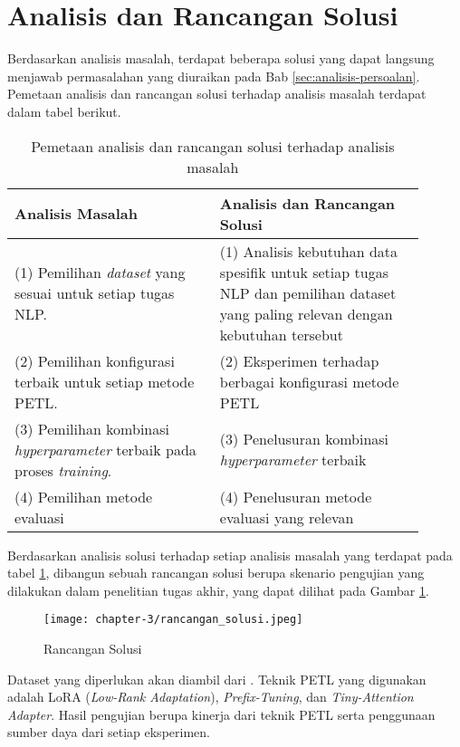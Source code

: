 \section{Analisis dan Rancangan Solusi}

Berdasarkan analisis masalah, terdapat beberapa solusi yang dapat langsung menjawab permasalahan yang diuraikan pada Bab \ref{sec:analisis-persoalan}. Pemetaan analisis dan rancangan solusi terhadap analisis masalah terdapat dalam tabel berikut.

\begin{table}[h!]
    \centering
    \begin{tabular}{|m{0.45\linewidth}|m{0.45\linewidth}|}
    \hline
    \textbf{Analisis Masalah} & \textbf{Analisis dan Rancangan Solusi} \\ \hline
    (1) Pemilihan \textit{dataset} yang sesuai untuk setiap tugas NLP.& (1) Analisis kebutuhan data spesifik untuk setiap tugas NLP dan pemilihan dataset yang paling relevan dengan kebutuhan tersebut\\ \hline
    (2) Pemilihan konfigurasi terbaik untuk setiap metode PETL. & (2) Eksperimen terhadap berbagai konfigurasi metode PETL \\ \hline
    (3) Pemilihan kombinasi \textit{hyperparameter} terbaik pada proses \textit{training}. & (3) Penelusuran kombinasi \textit{hyperparameter} terbaik\\ \hline
    (4) Pemilihan metode evaluasi & (4) Penelusuran metode evaluasi yang relevan \\ \hline
    \end{tabular}
\caption{Pemetaan analisis dan rancangan solusi terhadap analisis masalah}
\label{table:pemetaan-masalah-solusi}
\end{table}

Berdasarkan analisis solusi terhadap setiap analisis masalah yang terdapat pada tabel \ref{table:pemetaan-masalah-solusi}, dibangun sebuah rancangan solusi berupa skenario pengujian yang dilakukan dalam penelitian tugas akhir, yang dapat dilihat pada Gambar \ref{fig:rancangan-solusi}.

\begin{figure}[ht]
    \centering
    \texttt{[image: chapter-3/rancangan\_solusi.jpeg]}
    \caption{Rancangan Solusi}
    \label{fig:rancangan-solusi}
\end{figure}

Dataset yang diperlukan akan diambil dari \cite{nusacatalogue}. Teknik PETL yang digunakan adalah LoRA (\textit{Low-Rank Adaptation}), \textit{Prefix-Tuning}, dan \textit{Tiny-Attention Adapter}. Hasil pengujian berupa kinerja dari teknik PETL serta penggunaan sumber daya dari setiap eksperimen.